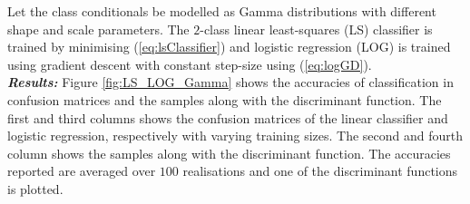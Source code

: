 \documentclass[12pt, a4 paper]{article}
\begin{document}
Let the class conditionals be modelled as Gamma distributions with different shape and scale parameters. The $2$-class linear least-squares (LS) classifier is trained by minimising (\ref{eq:lsClassifier}) and logistic regression (LOG) is trained using gradient descent with constant step-size using (\ref{eq:logGD}). \\

{\it \bfseries Results:} Figure \ref{fig:LS_LOG_Gamma} shows the accuracies of classification in confusion matrices and the samples along with the discriminant function. The first and third columns shows the confusion matrices of the linear classifier and logistic regression, respectively with varying training sizes. The second and fourth column shows the samples along with the discriminant function. The accuracies reported are averaged over $100$ realisations and one of the discriminant functions is plotted. \\
\end{document}

